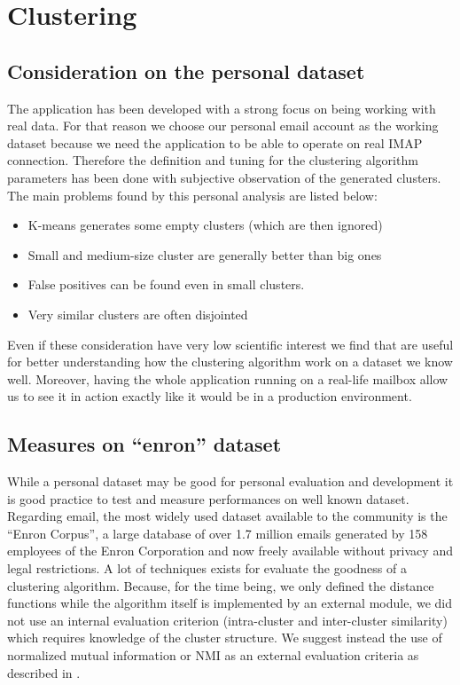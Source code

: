 \documentclass[a4paper,12pt]{report}
\begin{document}
\section{Clustering}
\subsection{Consideration on the personal dataset} %
\label{sub:consideration_on_the_personal_dataset}
The application has been developed with a strong focus on being working with real data. For that reason we choose our personal email account as the working dataset because we need the application to be able to operate on real IMAP connection. Therefore the definition and tuning for the clustering algorithm parameters has been done with subjective observation of the generated clusters.
The main problems found by this personal analysis are listed below: 
\begin{itemize}
  \item K-means generates some empty clusters (which are then ignored)
  \item Small and medium-size cluster are generally better than big ones
  \item False positives can be found even in small clusters.
  \item Very similar clusters are often disjointed 
\end{itemize}

Even if these consideration have very low scientific interest we find that are useful for better understanding how the clustering algorithm work on a dataset we know well. Moreover, having the whole application running on a real-life mailbox allow us to see it in action exactly like it would be in a production environment.


\subsection{Measures on ``enron'' dataset} %
\label{sub:measures_on_enron}
While a personal dataset may be good for personal evaluation and development it is good practice to test and measure performances on well known dataset. Regarding email, the most widely used dataset available to the community is the ``Enron Corpus'', a large database of over 1.7 million emails generated by 158 employees of the Enron Corporation and now freely available without privacy and legal restrictions.
A lot of techniques exists for evaluate the goodness of a clustering algorithm. Because, for the time being, we only defined the distance functions while the algorithm itself is implemented by an external module, we did not use an internal evaluation criterion (intra-cluster and inter-cluster similarity) which requires knowledge of the cluster structure.
We suggest instead the use of normalized mutual information or NMI as an external evaluation criteria as described in \cite{Manning2008}.
\end{document}
